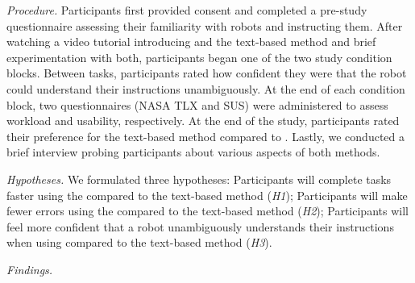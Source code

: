 \emph{Procedure.} Participants first provided consent and completed a pre-study questionnaire assessing their familiarity with robots and instructing them. After watching a video tutorial introducing \projname and the text-based method and brief experimentation with both, participants began one of the two study condition blocks. Between tasks, participants rated how confident they were that the robot could understand their instructions unambiguously. At the end of each condition block, two questionnaires (NASA TLX and SUS) were administered to assess workload and usability, respectively. At the end of the study, participants rated their preference for the text-based method compared to \projname. Lastly, we conducted a brief interview probing participants about various aspects of both methods.

\emph{Hypotheses.} We formulated three hypotheses: Participants will complete tasks faster using the \projname compared to the text-based method (\emph{H1}); Participants will make fewer errors using the \projname compared to the text-based method (\emph{H2}); Participants will feel more confident that a robot unambiguously understands their instructions when using \projname compared to the text-based method (\emph{H3}).

\emph{Findings.} 